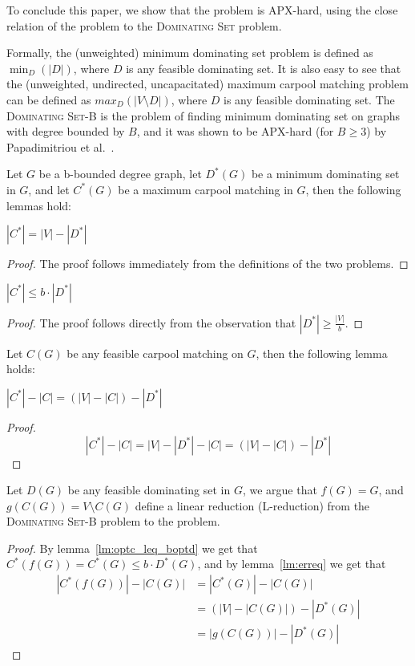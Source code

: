 \label{sec:hardness}
To conclude this paper, we show that the \textsc{\CARPOOL{}} problem is APX-hard,
using the close relation of the problem to the \textsc{Dominating Set} problem.

Formally, the (unweighted) minimum dominating set problem is defined as
$\min_{D}(|D|)$,
where $D$ is any feasible dominating set.
It is also easy to see that the (unweighted, undirected, uncapacitated) 
maximum carpool matching problem can be defined as $max_{D}(|V \setminus D|)$, 
where $D$ is any feasible dominating set.
The \textsc{Dominating Set-B} is the problem of finding minimum dominating set on 
graphs with degree bounded by $B$,
and it was shown to be APX-hard (for $B \geq 3$) by 
Papadimitriou et al.~\cite{papadimitriou1988optimization}.

Let $G$ be a b-bounded degree graph,
let $D^*(G)$ be a minimum dominating set in $G$,
and let $C^*(G)$ be a maximum carpool matching in $G$, 
then the following lemmas hold:

\begin{lemma}
$|C^*| = |V| - |D^*|$
\end{lemma}

\begin{proof}
The proof follows immediately from the definitions of the two problems. 
\end{proof}

\begin{lemma}
\label{lm:optc_leq_boptd}
$|C^*| \leq b \cdot |D^*|$
\end{lemma}

\begin{proof}
The proof follows directly from the observation that $|D^*| \geq \frac{|V|}{b}$.
\end{proof}

Let $C(G)$ be any feasible carpool matching on $G$, then the following lemma holds:

\begin{lemma}
\label{lm:erreq}
$|C^*| - |C| = (|V| - |C|) - |D^*|$
\end{lemma}

\begin{proof}
$$
|C^*| - |C| 				= 
|V| - |D^*| - |C| 	= 
(|V| - |C|) - |D^*|
$$
\end{proof}

Let $D(G)$ be any feasible dominating set in $G$, 
we argue that $f(G) = G$, and $g(C(G)) = V \setminus C(G)$ 
define a linear reduction (L-reduction) from the \textsc{Dominating Set-B} problem to the 
\textsc{\CARPOOL{}} problem.
\begin{proof}
By lemma~\ref{lm:optc_leq_boptd} we get that $C^*(f(G)) = C^*(G) \leq b \cdot D^*(G)$,
and by lemma~\ref{lm:erreq} we get that 
\begin{equation}
\begin{split}
|C^*(f(G))| - |C(G)|		& = |C^*(G)| - |C(G)| 			\\
							& = (|V| - |C(G)|) - |D^*(G)|	\\
							& = |g(C(G))| - |D^*(G)|
\end{split}
\end{equation}
\end{proof}

